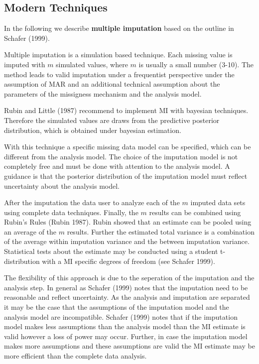 \subsection{Modern Techniques} 
 In the following we describe \textbf{multiple imputation} based on the outline in Schafer (1999). \par  
Multiple imputation is a simulation based technique. Each missing value is imputed with $m$  simulated  values, where $m$ is usually a small number (3-10). The method leads to valid imputation under a frequentist perspective under the assumption of MAR and an additional technical assumption about the parameters of the missigness mechanism and the analysis model. \par 
Rubin and Little (1987) recommend to implement MI with bayesian techniques. Therefore the simulated values are draws from the predictive posterior distribution, which is obtained under bayesian estimation.  \par
 With this technique a specific missing data model can be specified, which can be different from the analysis model. The choice of the imputation model is not completely free and must be done with attention to the analysis model. A guidance is that the posterior distribution of the imputation model must reflect uncertainty about the analysis model. \par 
After the imputation  the data user to analyze each of the $m$ imputed data sets using complete data techniques. Finally, the $m$ results can be combined using Rubin's Rules (Rubin 1987).  Rubin showed that an estimate can be pooled using an average of the $m$ results. Further the estimated total variance is a combination of the average within imputation variance and the between imputation variance. Statistical tests about the estimate may be conducted using a student t-distribution with a MI specific degrees of freedom (see Schafer 1999).   \par The flexibility of this approach is due to the seperation of the imputation and the analysis step. In general as Schafer (1999) notes that the imputation need to be reasonable and reflect uncertainty. As the analysis and imputation are separated it may be the case that the assumptions of the imputation model and the analysis model are incompatible. Schafer (1999) notes that if the imputation model makes less assumptions than the  analysis model than the MI estimate is valid however a loss of power may occur. Further, in case the imputation model makes more assumptions and these assumptions are valid the MI estimate may be more efficient than the complete data analysis. \par 
